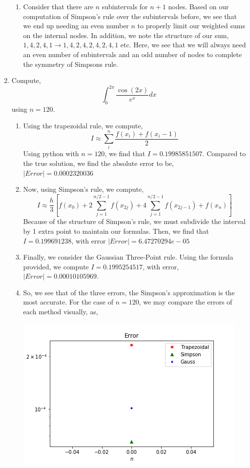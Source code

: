 \documentclass[letterpaper,10pt]{article}
\begin{document}
\begin{enumerate}
\begin{enumerate}
\item Consider that there are $n$ subintervals for $n+1$ nodes. Based on our computation of Simpson's rule over the subintervals before, we see that we end up needing an even number $n$ to properly limit our weighted sums on the internal nodes. In addition, we note the structure of our sum, $1,4,2,4,1\to 1,4,2,4,2,4,2,4,1$ etc. Here, we see that we will always need an even number of subintervals and an odd number of nodes to complete the symmetry of Simpsons rule.
\end{enumerate}
\item Compute,
\[\int_0^{2\pi}\frac{\cos(2x)}{e^x}dx\]
using $n=120$.
\begin{enumerate}
\item Using the trapezoidal rule, we compute,
\[I\approx \sum_i^n\frac{f(x_i)+f(x_i-1)}{2}\]
Using python with $n=120$, we find that $I=0.19985851507$. Compared to the true solution, we find the absolute error to be, $|Error|=0.0002320036$
\item Now, using Simpson's rule, we compute,
\[I\approx \frac{h}{3}\left[f(x_0)+2\sum_{j=1}^{n/2-1}f(x_{2j})+4\sum_{j=1}^{n/2-1}f(x_{2j-1})+f(x_n)\right]\]
Because of the structure of Simpson's rule, we must subdivide the interval by 1 extra point to maintain our formulas. Then, we find that $I=0.199691238$, with error $|Error|=6.47270294e-05$
\item Finally, we consider the Gaussian Three-Point rule. Using the formula provided, we compute $I=0.1995254517$, with error, $|Error|=0.00010105969$.
\item So, we see that of the three errors, the Simpson's approximation is the most accurate. For the case of $n=120$, we may compare the errors of each method visually, as,
\begin{center}
\includegraphics[scale=.7]{7err.png}

\end{center}
\end{enumerate}
\end{enumerate}
\end{document}
